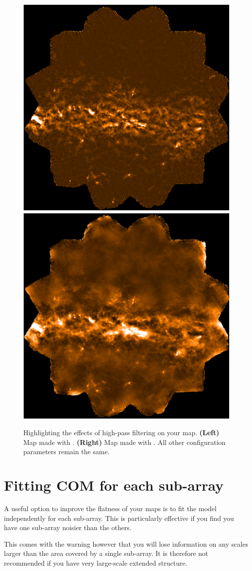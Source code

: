 \documentclass[11pt,oneside,chapters]{starlink}
\begin{document}
\begin{figure}
\includegraphics[width=0.46\linewidth]{sc21_brex_19}
\hspace{7mm}
\includegraphics[width=0.46\linewidth]{sc21_brex_18}
\caption[Illustrating the effects of high-pass filtering]{
  Highlighting the effects of high-pass filtering on your map.
  \textbf{(Left)} Map made with .
  \textbf{(Right)} Map made with .
  All other configuration parameters remain the same.\label{fig:fltcompare}
}
\end{figure}


\section{Fitting COM for each sub-array}
\label{sec:fitcom}

A useful option to improve the flatness of your maps is to fit the
 model independently for each sub-array. This is
particularly effective if you find you have one sub-array noisier than
the others.

This comes with the warning however that you will lose information on
any scales larger than the area covered by a single sub-array. It is
therefore not recommended if you have very large-scale extended
structure.
\end{document}
